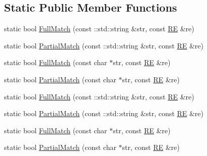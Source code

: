 \subsection*{Static Public Member Functions}
\begin{DoxyCompactItemize}
\item 
static bool \hyperlink{classtesting_1_1internal_1_1_r_e_aa79a950758d0f1d62f7762d1e9cefe86}{Full\-Match} (const \-::std\-::string \&str, const \hyperlink{classtesting_1_1internal_1_1_r_e}{R\-E} \&re)
\item 
static bool \hyperlink{classtesting_1_1internal_1_1_r_e_a1e81f9a87211bdca645e025f8f0236c8}{Partial\-Match} (const \-::std\-::string \&str, const \hyperlink{classtesting_1_1internal_1_1_r_e}{R\-E} \&re)
\item 
static bool \hyperlink{classtesting_1_1internal_1_1_r_e_a2b13ec1f6ccd6c32f7efa01e21588f0b}{Full\-Match} (const char $\ast$str, const \hyperlink{classtesting_1_1internal_1_1_r_e}{R\-E} \&re)
\item 
static bool \hyperlink{classtesting_1_1internal_1_1_r_e_a97495dd4c2bb9589522823f060c8e8ba}{Partial\-Match} (const char $\ast$str, const \hyperlink{classtesting_1_1internal_1_1_r_e}{R\-E} \&re)
\item 
static bool \hyperlink{classtesting_1_1internal_1_1_r_e_aa79a950758d0f1d62f7762d1e9cefe86}{Full\-Match} (const \-::std\-::string \&str, const \hyperlink{classtesting_1_1internal_1_1_r_e}{R\-E} \&re)
\item 
static bool \hyperlink{classtesting_1_1internal_1_1_r_e_a1e81f9a87211bdca645e025f8f0236c8}{Partial\-Match} (const \-::std\-::string \&str, const \hyperlink{classtesting_1_1internal_1_1_r_e}{R\-E} \&re)
\item 
static bool \hyperlink{classtesting_1_1internal_1_1_r_e_a2b13ec1f6ccd6c32f7efa01e21588f0b}{Full\-Match} (const char $\ast$str, const \hyperlink{classtesting_1_1internal_1_1_r_e}{R\-E} \&re)
\item 
static bool \hyperlink{classtesting_1_1internal_1_1_r_e_a97495dd4c2bb9589522823f060c8e8ba}{Partial\-Match} (const char $\ast$str, const \hyperlink{classtesting_1_1internal_1_1_r_e}{R\-E} \&re)
\end{DoxyCompactItemize}


